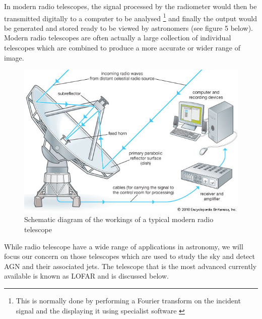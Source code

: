 \documentclass{article}
\begin{document}
In modern radio telescopes, the signal processed by the radiometer would then be transmitted digitally to a computer to be analysed \footnote{This is normally done by performing a Fourier transform on the incident signal and the displaying it using specialist software \cite{radiobook}} and finally the output would be generated and stored ready to be viewed by astronomers (see figure 5 below). Modern radio telescopes are often actually a large collection of individual telescopes which are combined to produce a more accurate or wider range of image.

\begin{figure}
    \centering
    \includegraphics[scale = 0.5]{radio_works.jpg}
    \caption{Schematic diagram of the workings of a typical modern radio telescope}
    \label{fig:radio work}
\end{figure}

While radio telescope have a wide range of applications in astronomy, we will focus our concern on those telescopes which are used to study the sky and detect AGN and their associated jets. The telescope that is the most advanced currently available is known as LOFAR and is discussed below.
\end{document}

